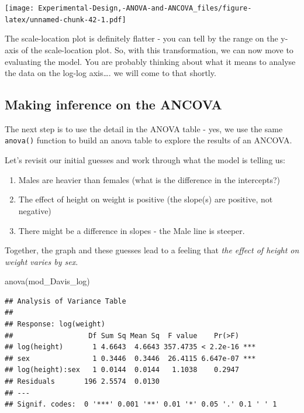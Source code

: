 \documentclass[
]{book}
\newenvironment{Shaded}{\begin{snugshade}}{\end{snugshade}}
\newcommand{\FunctionTok}[1]{\textcolor[rgb]{0.00,0.00,0.00}{#1}}
\newcommand{\NormalTok}[1]{#1}
\providecommand{\tightlist}{%
  \setlength{\itemsep}{0pt}\setlength{\parskip}{0pt}}
\begin{document}
\texttt{[image: Experimental-Design,-ANOVA-and-ANCOVA\_files/figure-latex/unnamed-chunk-42-1.pdf]}

The scale-location plot is definitely flatter - you can tell by the range on the y-axis of the scale-location plot. So, with this transformation, we can now move to evaluating the model. You are probably thinking about what it means to analyse the data on the log-log axis\ldots. we will come to that shortly.

\hypertarget{making-inference-on-the-ancova}{%
\subsection{Making inference on the ANCOVA}\label{making-inference-on-the-ancova}}

The next step is to use the detail in the ANOVA table - yes, we use the same \texttt{anova()} function to build an anova table to explore the results of an ANCOVA.

Let's revisit our initial guesses and work through what the model is telling us:

\begin{enumerate}
\def\labelenumi{\arabic{enumi}.}
\tightlist
\item
  Males are heavier than females (what is the difference in the intercepts?)
\item
  The effect of height on weight is positive (the slope(s) are positive, not negative)
\item
  There might be a difference in slopes - the Male line is steeper.
\end{enumerate}

Together, the graph and these guesses lead to a feeling that \emph{the effect of height on weight varies by sex}.

\begin{Shaded}
\begin{Highlighting}[]
\FunctionTok{anova}\NormalTok{(mod\_Davis\_log)}
\end{Highlighting}
\end{Shaded}

\begin{verbatim}
## Analysis of Variance Table
## 
## Response: log(weight)
##                  Df Sum Sq Mean Sq  F value    Pr(>F)    
## log(height)       1 4.6643  4.6643 357.4735 < 2.2e-16 ***
## sex               1 0.3446  0.3446  26.4115 6.647e-07 ***
## log(height):sex   1 0.0144  0.0144   1.1038    0.2947    
## Residuals       196 2.5574  0.0130                       
## ---
## Signif. codes:  0 '***' 0.001 '**' 0.01 '*' 0.05 '.' 0.1 ' ' 1
\end{verbatim}
\end{document}
